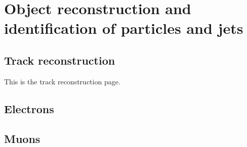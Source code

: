 \chapter{Object reconstruction and identification of particles and jets}
\label{sec:reconstruction-and-identification}


\section{Track reconstruction}
\label{sec:track-reconstruction}

This is the track reconstruction page.

\section{Electrons}
\label{id-electrons}

\section{Muons}
\label{id-muons}


